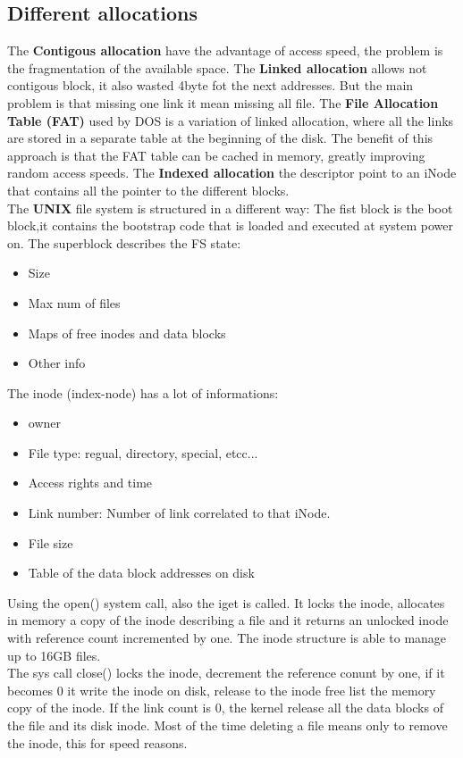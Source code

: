 \documentclass[12pt]{article}
\begin{document}
\subsection{Different allocations}
The \textbf{Contigous allocation} have the advantage of access speed, the problem is the fragmentation of the available space. The \textbf{Linked allocation} allows not contigous block, it also wasted 4byte fot the next addresses. But the main problem is that missing one link it mean missing all file. The \textbf{File Allocation Table (FAT)} used by DOS is a variation of linked allocation, where all the links are stored in a separate table at the beginning of the disk. The beneﬁt of this approach is that the FAT table can be cached in memory, greatly improving random access speeds. The \textbf{Indexed allocation} the descriptor point to an iNode that contains all the pointer to the different blocks.\\
The \textbf{UNIX} file system is structured in a different way: The fist block is the boot block,it contains the bootstrap code that is loaded and executed at system power on. The superblock describes the FS state:
\begin{itemize}
  \item Size
  \item Max num of files
  \item Maps of free inodes and data blocks
  \item Other info
\end{itemize}
The inode (index-node) has a lot of informations:
\begin{itemize}
  \item owner
  \item File type: regual, directory, special, etcc...
  \item Access rights and time
  \item Link number: Number of link correlated to that iNode.
  \item File size
  \item Table of the data block addresses on disk
\end{itemize}
Using the open() system call, also the iget is called. It locks the inode, allocates in memory a copy of the inode describing a file and it returns an unlocked inode with reference count incremented by one. The inode structure is able to manage up to 16GB files.\\
The sys call close() locks the inode, decrement the reference conunt by one, if it becomes 0 it write the inode on disk, release to the inode free list the memory copy of the inode. If the link count is 0, the kernel release all the data blocks of the file and its disk inode. Most of the time deleting a file means only to remove the inode, this for speed reasons.
\end{document}
